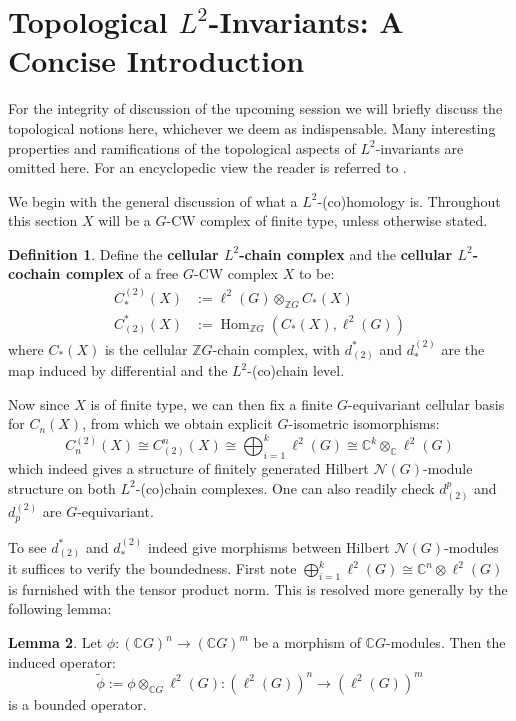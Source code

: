 \documentclass[11pt]{report}
\theoremstyle{definition}
\newtheorem{Def}{Definition}[chapter]
\newtheorem{Lemma}[Def]{Lemma}
\theoremstyle{plain}
\DeclareMathOperator{\Hom}{Hom}
\newcommand{\complex}{\mathbb{C}}
\newcommand{\integer}{\mathbb{Z}}
\newcommand{\vna}{\mathcal{N}}
\renewcommand{\tilde}{\widetilde}
\begin{document}
\section{Topological $L^2$-Invariants: A Concise Introduction}
 For the integrity of discussion of the upcoming session we will briefly discuss the topological notions here, whichever we deem as indispensable. Many interesting properties and ramifications of the topological aspects of $L^2$-invariants are omitted here. For an encyclopedic view the reader is referred to \cite{luck2013}. 
\par We begin with the general discussion of what a $L^2$-(co)homology is. Throughout this section $X$ will be a $G$-CW complex of finite type, unless otherwise stated.
\begin{Def}
	Define the \textbf{cellular $L^2$-chain complex} and the \textbf{cellular $L^2$-cochain complex} of a free $G$-CW complex $X$ to be:
\begin{align*}
C^{(2)}_*(X)&:=\ell^2(G)\otimes_{\integer G} C_*(X)\\
C_{(2)}^*(X)&:=\Hom_{\integer G}(C_*(X), \ell^2(G))
\end{align*}
where $C_*(X)$ is the cellular $\integer G$-chain complex, with $d^*_{(2)}$ and $d_*^{(2)}$ are the map induced by differential and the $L^2$-(co)chain level.
\end{Def}
Now since $X$ is of finite type, we can then fix a finite $G$-equivariant cellular basis for $C_n(X)$, from which we obtain explicit $G$-isometric isomorphisms:
\begin{equation}\label{1.29}
C^{(2)}_n(X)\cong C^n_{(2)}(X)\cong \bigoplus^k_{i=1} \ell^2(G)\cong \complex^k\otimes_\complex \ell^2(G)
\end{equation}
which indeed gives a structure of finitely generated Hilbert $\vna(G)$-module structure on both $L^2$-(co)chain complexes. One can also readily check $d^p_{(2)}$ and $d_p^{(2)}$ are $G$-equivariant.
\par To see $d^*_{(2)}$ and $d_*^{(2)}$  indeed give morphisms between Hilbert $\vna(G)$-modules it suffices to verify the boundedness. First note $\bigoplus_{i=1}^k \ell^2(G)\cong \complex^n\otimes \ell^2(G)$ is furnished with the tensor product norm. This is resolved more generally by the following lemma:
	\begin{Lemma}
		Let $\phi: (\complex G)^n\to (\complex G)^m$ be a morphism of $\complex G$-modules. Then the induced operator:
		\begin{equation*}
		\tilde{\phi}:=\phi\otimes_{\complex G}\ell^2(G): (\ell^2(G))^n\to (\ell^2(G))^m
		\end{equation*}
		is a bounded operator.
	\end{Lemma}
\end{document}

